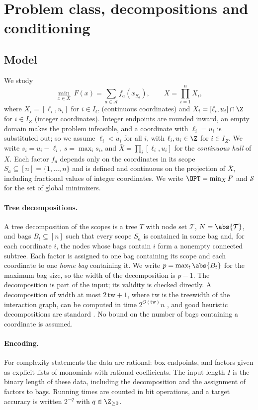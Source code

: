 \section{Problem class, decompositions and conditioning}\label{sec:setting}

\subsection{Model}
We study
\begin{equation}\label{eq:model}
\min_{x\in X}\ F(x)=\sum_{a\in\mathcal A}f_a(x_{S_a}),\qquad
X=\prod_{i=1}^nX_i ,
\end{equation}
where $X_i=[\ell_i,u_i]$ for $i\in I_C$ (continuous coordinates) and
$X_i=[\ell_i,u_i]\cap\Z$ for $i\in I_Z$ (integer coordinates). Integer
endpoints are rounded inward, an empty domain makes the problem infeasible,
and a coordinate with $\ell_i=u_i$ is substituted out; so we assume
$\ell_i<u_i$ for all $i$, with $\ell_i,u_i\in\Z$ for $i\in I_Z$. We write
$s_i=u_i-\ell_i$, $s=\max_is_i$, and $\bar X=\prod_i[\ell_i,u_i]$ for the
\emph{continuous hull} of $X$. Each factor $f_a$ depends only on the
coordinates in its scope $S_a\subseteq[n]=\{1,\dots,n\}$ and is defined and
continuous on the projection of $\bar X$, including fractional values of
integer coordinates. We write $\OPT=\min_XF$ and $\mathcal S$ for the set of
global minimizers.

\paragraph{Tree decompositions.}
A tree decomposition of the scopes is a tree $T$ with node set $\mathcal T$,
$N=\abs{\mathcal T}$, and bags $B_t\subseteq[n]$ such that every scope $S_a$
is contained in some bag and, for each coordinate $i$, the nodes whose bags
contain $i$ form a nonempty connected subtree. Each factor is assigned to
one bag containing its scope and each coordinate to one \emph{home bag}
containing it. We write $p=\max_t\abs{B_t}$ for the maximum bag size, so the
width of the decomposition is $p-1$. The decomposition is part of the input;
its validity is checked directly. A decomposition of width at most
$2\,\mathrm{tw}+1$, where $\mathrm{tw}$ is the treewidth of the interaction
graph, can be computed in time $2^{O(\mathrm{tw})}n$ \cite{Korhonen2021}, and
good heuristic decompositions are standard \cite{BodlaenderKoster2010}. No bound
on the number of bags containing a coordinate is assumed.

\paragraph{Encoding.}
For complexity statements the data are rational: box endpoints, and factors
given as explicit lists of monomials with rational coefficients. The input
length $I$ is the binary length of these data, including the decomposition
and the assignment of factors to bags. Running times are counted in bit
operations, and a target accuracy is written $2^{-q}$ with $q\in\Z_{\ge0}$.


